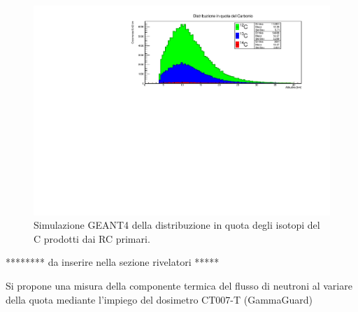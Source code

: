 \begin{enumerate}
\begin{figure}
    \label{Neutroni}
\end{figure}
\begin{figure}
    \centering
    \includegraphics[width=.9\linewidth]{Carbonio_verticale.pdf}
    \caption{Simulazione GEANT4 della distribuzione in quota degli isotopi del C prodotti dai RC primari.}
    \label{Carbonio}
\end{figure}

******** da inserire nella sezione rivelatori *****

Si propone una misura della componente termica del flusso di neutroni al variare della quota mediante l'impiego del dosimetro CT007-T (GammaGuard) 
\end{enumerate}


